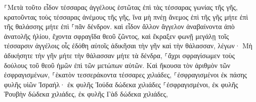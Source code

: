 \documentclass{openreader}
\begin{document}
⸀Μετὰ τοῦτο εἶδον τέσσαρας ἀγγέλους ἑστῶτας ἐπὶ τὰς τέσσαρας γωνίας τῆς γῆς, κρατοῦντας τοὺς τέσσαρας ἀνέμους τῆς γῆς, ἵνα μὴ πνέῃ ἄνεμος ἐπὶ τῆς γῆς μήτε ἐπὶ τῆς θαλάσσης μήτε ἐπὶ ⸀πᾶν δένδρον. 
καὶ εἶδον ἄλλον ἄγγελον ἀναβαίνοντα ἀπὸ ἀνατολῆς ἡλίου, ἔχοντα σφραγῖδα θεοῦ ζῶντος, καὶ ἔκραξεν φωνῇ μεγάλῃ τοῖς τέσσαρσιν ἀγγέλοις οἷς ἐδόθη αὐτοῖς ἀδικῆσαι τὴν γῆν καὶ τὴν θάλασσαν, 
λέγων· Μὴ ἀδικήσητε τὴν γῆν μήτε τὴν θάλασσαν μήτε τὰ δένδρα, ⸀ἄχρι σφραγίσωμεν τοὺς δούλους τοῦ θεοῦ ἡμῶν ἐπὶ τῶν μετώπων αὐτῶν. 
Καὶ ἤκουσα τὸν ἀριθμὸν τῶν ἐσφραγισμένων, ⸀ἑκατὸν τεσσεράκοντα τέσσαρες χιλιάδες, ⸀ἐσφραγισμένοι ἐκ πάσης φυλῆς υἱῶν Ἰσραήλ· 
ἐκ φυλῆς Ἰούδα δώδεκα χιλιάδες ⸀ἐσφραγισμένοι, ἐκ φυλῆς Ῥουβὴν δώδεκα χιλιάδες, ἐκ φυλῆς Γὰδ δώδεκα χιλιάδες, 
\end{document}
